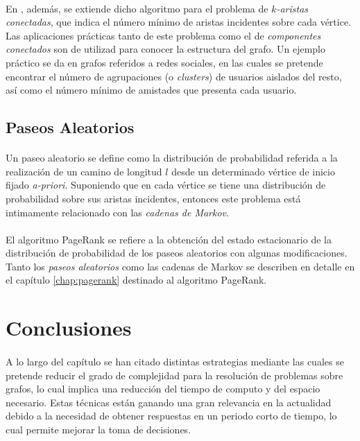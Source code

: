 \documentclass{subfiles}
\begin{document}
        \paragraph{}
        En \cite{ahn2012analyzing}, además, se extiende dicho algoritmo para el problema de \emph{$k$-aristas conectadas}, que indica el número mínimo de aristas incidentes sobre cada vértice. Las aplicaciones prácticas tanto de este problema como el de \emph{componentes conectados} son de utilizad para conocer la estructura del grafo. Un ejemplo práctico se da en grafos referidos a redes sociales, en las cuales se pretende encontrar el número de agrupaciones (o \emph{clusters}) de usuarios aislados del resto, así como el número mínimo de amistades que presenta cada usuario.

      \subsection{Paseos Aleatorios}
      \label{sec:random_walks_overview}

        \paragraph{}
        Un paseo aleatorio se define como la distribución de probabilidad referida a la realización de un camino de longitud $l$ desde un determinado vértice de inicio fijado \emph{a-priori}. Suponiendo que en cada vértice se tiene una distribución de probabilidad sobre sus aristas incidentes, entonces este problema está intimamente relacionado con las \emph{cadenas de Markov}.

        \paragraph{}
        El algoritmo PageRank se refiere a la obtención del estado estacionario de la distribución de probabilidad de los paseos aleatorios con algunas modificaciones. Tanto los \emph{paseos aleatorios} como las cadenas de Markov se describen en detalle en el capítulo \ref{chap:pagerank} destinado al algoritmo PageRank.

    \section{Conclusiones}
    \label{sec:graph_conclusions}

      \paragraph{}
      A lo largo del capítulo se han citado distintas estrategias mediante las cuales se pretende reducir el grado de complejidad para la resolución de problemas sobre grafos, lo cual implica una reducción del tiempo de computo y del espacio necesario. Estas técnicas están ganando una gran relevancia en la actualidad debido a la necesidad de obtener respuestas en un periodo corto de tiempo, lo cual permite mejorar la toma de decisiones.
\end{document}
